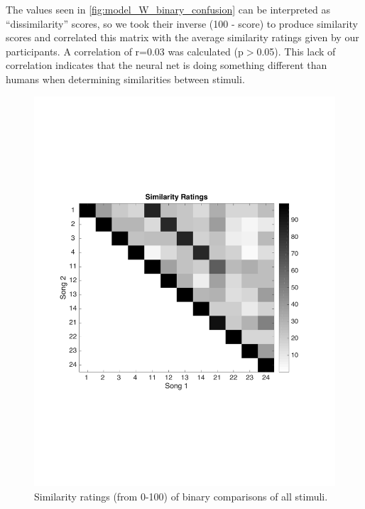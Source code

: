 The values seen in \autoref{fig:model_W_binary_confusion} can be interpreted as ``dissimilarity'' scores, so we took their inverse (100 - score) to produce similarity scores and correlated this matrix with the average similarity ratings given by our participants.
A correlation of r=0.03 was calculated (p$>$0.05).
This lack of correlation indicates that the neural net is doing something different than humans when determining similarities between stimuli. 

\begin{figure}[h] 
  \begin{center}
    \includegraphics[scale=0.6]{Figures/Similarity}
    \caption{Similarity ratings (from 0-100) of binary comparisons of all stimuli.}
    \label{fig:Similarity}
  \end{center}
\end{figure}
